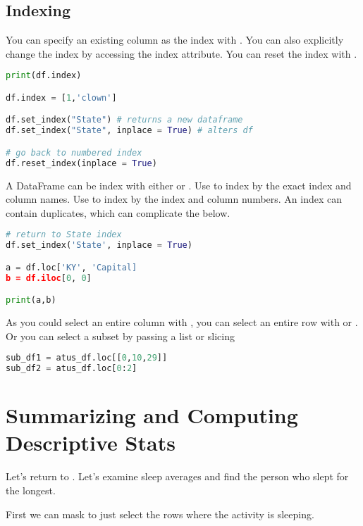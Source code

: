 \subsection{Indexing}

You can specify an existing column as the index with . You can also explicitly change the index by accessing the index attribute. You can reset the index with .

\begin{lstlisting}[language = Python]
print(df.index)

df.index = [1,'clown']

df.set_index("State") # returns a new dataframe
df.set_index("State", inplace = True) # alters df

# go back to numbered index
df.reset_index(inplace = True)
\end{lstlisting}


A DataFrame can be index with either  or . Use  to index by the exact index and column names. Use  to index by the index and column numbers. An index can contain duplicates, which can complicate the below. 

\begin{lstlisting}[language = Python]
# return to State index
df.set_index('State', inplace = True)

a = df.loc['KY', 'Capital]
b = df.iloc[0, 0]

print(a,b)
\end{lstlisting}

As you could select an entire column with , you can select an entire row with  or . Or you can select a subset by passing a list or slicing 

\begin{lstlisting}[language = Python]
sub_df1 = atus_df.loc[[0,10,29]]
sub_df2 = atus_df.loc[0:2]
\end{lstlisting}


\section{Summarizing and Computing Descriptive Stats}

Let's return to . Let's examine sleep averages and find the person who slept for the longest. 

First we can mask to just select the rows where the activity is sleeping. 


